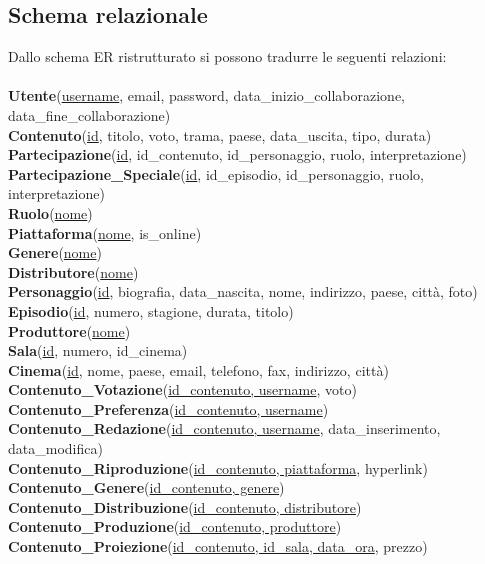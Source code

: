 \documentclass[a4paper]{article}
\begin{document}
\subsection{Schema relazionale}
Dallo schema ER ristrutturato si possono tradurre le seguenti relazioni:\\\\
\textbf{Utente}(\underline{username}, email, password, data\_inizio\_collaborazione, data\_fine\_collaborazione)\\
\textbf{Contenuto}(\underline{id}, titolo, voto, trama, paese, data\_uscita, tipo, durata)\\
\textbf{Partecipazione}(\underline{id}, id\_contenuto, id\_personaggio, ruolo, interpretazione)\\
\textbf{Partecipazione\_Speciale}(\underline{id}, id\_episodio, id\_personaggio, ruolo, interpretazione)\\
\textbf{Ruolo}(\underline{nome})\\
\textbf{Piattaforma}(\underline{nome}, is\_online)\\
\textbf{Genere}(\underline{nome})\\
\textbf{Distributore}(\underline{nome})\\
\textbf{Personaggio}(\underline{id}, biografia, data\_nascita, nome, indirizzo, paese, città, foto)\\
\textbf{Episodio}(\underline{id}, numero, stagione, durata, titolo)\\
\textbf{Produttore}(\underline{nome})\\
\textbf{Sala}(\underline{id}, numero, id\_cinema)\\
\textbf{Cinema}(\underline{id}, nome, paese, email, telefono, fax, indirizzo, città)\\
\textbf{Contenuto\_Votazione}(\underline{id\_contenuto, username}, voto)\\
\textbf{Contenuto\_Preferenza}(\underline{id\_contenuto, username})\\
\textbf{Contenuto\_Redazione}(\underline{id\_contenuto, username}, data\_inserimento, data\_modifica)\\
\textbf{Contenuto\_Riproduzione}(\underline{id\_contenuto, piattaforma}, hyperlink)\\
\textbf{Contenuto\_Genere}(\underline{id\_contenuto, genere})\\
\textbf{Contenuto\_Distribuzione}(\underline{id\_contenuto, distributore})\\
\textbf{Contenuto\_Produzione}(\underline{id\_contenuto, produttore})\\
\textbf{Contenuto\_Proiezione}(\underline{id\_contenuto, id\_sala, data\_ora}, prezzo)\\
\end{document}
